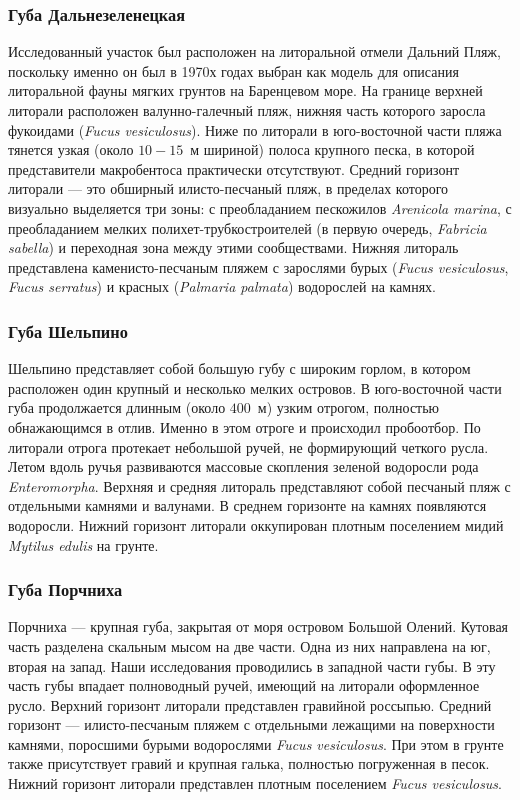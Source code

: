 \subsubsection{Губа Дальнезеленецкая}
Исследованный   участок   был   расположен   на   литоральной   отмели   Дальний   Пляж, поскольку именно он был в 1970х годах выбран как модель для описания литоральной фауны мягких   грунтов   на   Баренцевом   море.   
На   границе   верхней   литорали   расположен   валунно-галечный   пляж,  нижняя   часть которого заросла фукоидами ({\it Fucus vesiculosus}). 
Ниже по литорали в юго-восточной части пляжа   тянется   узкая   (около   $10-15$~м   шириной)   полоса   крупного   песка,   в   которой представители макробентоса практически отсутствуют.
Средний   горизонт   литорали --- это   обширный   илисто-песчаный   пляж,   в  пределах которого визуально выделяется три зоны: с преобладанием пескожилов  {\it Arenicola marina}, с преобладанием   мелких   полихет-трубкостроителей   (в   первую   очередь, {\it Fabricia   sabella})   и переходная   зона   между   этими   сообществами.   
Нижняя   литораль   представлена   каменисто-песчаным пляжем с зарослями бурых ({\it Fucus vesiculosus}, {\it Fucus serratus}) и красных ({\it Palmaria  palmata}) водорослей на камнях.

\subsubsection{Губа Шельпино}
Шельпино   представляет   собой   большую   губу   с   широким   горлом,   в   котором расположен   один   крупный   и   несколько   мелких   островов.   
В   юго-восточной   части   губа продолжается   длинным   (около   $400$~м)   узким   отрогом,   полностью   обнажающимся   в   отлив. 
Именно в этом отроге и происходил пробоотбор. 
По   литорали   отрога   протекает   небольшой   ручей,   не   формирующий   четкого   русла. 
Летом вдоль ручья развиваются массовые скопления зеленой водоросли рода  {\it Enteromorpha}. 
Верхняя и средняя литораль представляют собой песчаный пляж с отдельными камнями и валунами. 
В среднем горизонте на камнях появляются водоросли. 
Нижний горизонт литорали оккупирован плотным поселением мидий {\it Mytilus edulis} на грунте.

\subsubsection{Губа Порчниха}
Порчниха  ---  крупная   губа,   закрытая   от   моря   островом   Большой   Олений.   
Кутовая часть разделена скальным мысом на две части. 
Одна из них направлена на юг, вторая на запад. 
Наши   исследования   проводились   в   западной   части   губы.   
В   эту   часть   губы   впадает полноводный ручей, имеющий на литорали оформленное русло. 
Верхний горизонт литорали представлен   гравийной   россыпью.   
Средний   горизонт   ---   илисто-песчаным   пляжем   с отдельными   лежащими   на   поверхности   камнями,   поросшими   бурыми   водорослями  {\it Fucus vesiculosus}.   
При   этом   в   грунте   также   присутствует   гравий   и   крупная   галька,   полностью погруженная в песок. 
Нижний горизонт литорали представлен плотным поселением   {\it Fucus  vesiculosus}.

